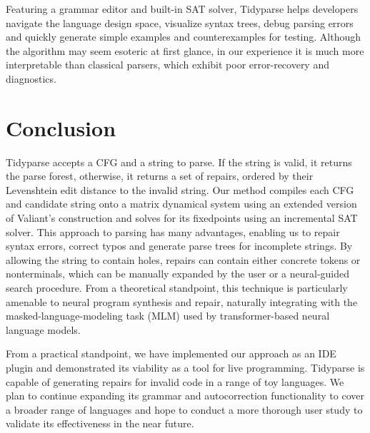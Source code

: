 \documentclass[sigplan,review,anonymous,acmsmall]{acmart}\settopmatter{printfolios=false,printccs=false,printacmref=false}
\begin{document}
Featuring a grammar editor and built-in SAT solver, Tidyparse helps developers navigate the language design space, visualize syntax trees, debug parsing errors and quickly generate simple examples and counterexamples for testing. Although the algorithm may seem esoteric at first glance, in our experience it is much more interpretable than classical parsers, which exhibit poor error-recovery and diagnostics.

\section{Conclusion}

Tidyparse accepts a CFG and a string to parse. If the string is valid, it returns the parse forest, otherwise, it returns a set of repairs, ordered by their Levenshtein edit distance to the invalid string. Our method compiles each CFG and candidate string onto a matrix dynamical system using an extended version of Valiant's construction and solves for its fixedpoints using an incremental SAT solver. This approach to parsing has many advantages, enabling us to repair syntax errors, correct typos and generate parse trees for incomplete strings. By allowing the string to contain holes, repairs can contain either concrete tokens or nonterminals, which can be manually expanded by the user or a neural-guided search procedure. From a theoretical standpoint, this technique is particularly amenable to neural program synthesis and repair, naturally integrating with the masked-language-modeling task (MLM) used by transformer-based neural language models.

From a practical standpoint, we have implemented our approach as an IDE plugin and demonstrated its viability as a tool for live programming. Tidyparse is capable of generating repairs for invalid code in a range of toy languages. We plan to continue expanding its grammar and autocorrection functionality to cover a broader range of languages and hope to conduct a more thorough user study to validate its effectiveness in the near future. %

\end{document}
